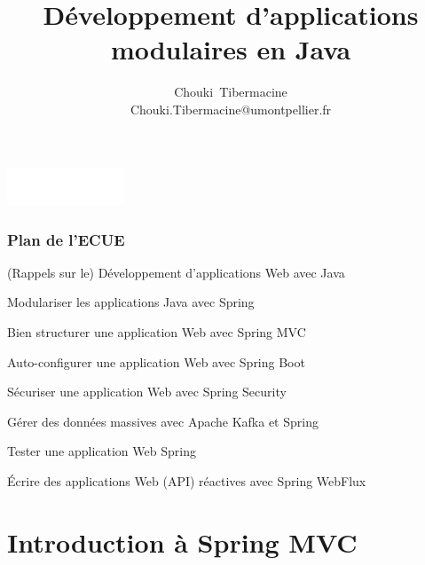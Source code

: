 \documentclass{beamer}
\title[]{\Large{Développement d'applications modulaires en Java}}
\author[C. Tibermacine]{\large{Chouki~Tibermacine}\\
\small{Chouki.Tibermacine@umontpellier.fr}}
\date{\tiny{}}
\begin{document}
\begin{frame}
\titlepage
\begin{flushright}
\includegraphics[width=3.5cm]{figs/polytech.png}
\end{flushright}
\end{frame}

\begin{frame}
	\frametitle{Plan de l'ECUE}
	\begin{enumerate}
	{\color{gray} \item (Rappels sur le) Développement d'applications Web avec Java
		\item Modulariser les applications Java avec Spring}
		\item Bien structurer une application Web avec Spring MVC
	{\color{gray}				
		\item Auto-configurer une application Web avec Spring Boot
		\item Sécuriser une application Web avec Spring Security
		\item Gérer des données massives avec Apache Kafka et Spring
		\item Tester une application Web Spring
		\item Écrire des applications Web (API) réactives avec Spring WebFlux}
	\end{enumerate}
\end{frame}



\section{Introduction à Spring MVC}
\end{document}
